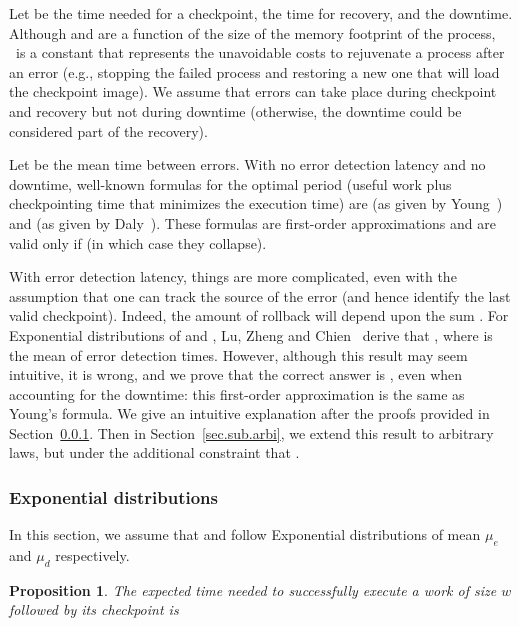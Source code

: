 \documentclass[10pt,table]{article}
\newtheorem{proposition}{Proposition}
\newcommand{\ema}[1]{\ensuremath{#1}\xspace}
\newcommand{\www}{\ema{w}}
\newcommand{\mue}{\ema{\mu_{e}}}
\newcommand{\mud}{\ema{\mu_{d}}}
\begin{document}
 Let  be the time needed for a checkpoint,   the time for
recovery, and  the downtime. Although  and  are
a function of the size of the memory footprint of the process, ~is a constant 
that represents the unavoidable costs to rejuvenate a
process after an error (e.g., stopping the failed process and restoring
a new one that will load the checkpoint image). We assume that errors
can take place during checkpoint and recovery but not during downtime (otherwise, the downtime
could be considered part of the recovery). 

Let  be the mean time between errors.
With  no error detection latency and no downtime, well-known formulas for the optimal period 
(useful work plus checkpointing time that minimizes the execution time)
are  (as given by Young~\cite{young74})
and  (as given by Daly~\cite{daly04}).
These formulas are first-order approximations and are valid only if  
(in which case they collapse). 

With error detection latency, things are more complicated, even with the assumption
 that one can track the source of the error (and hence identify the last valid checkpoint). 
 Indeed, the amount of rollback will depend upon the sum .
For Exponential distributions of   and , Lu, Zheng and Chien~\cite{LuZhengChien2013} derive that 
   , 
  where  is the mean of error detection times. 
However, although this result may seem intuitive, it is wrong, and we prove that the correct answer
is , even when accounting for the downtime: 
this first-order approximation is the same as Young's formula. We give an intuitive explanation after the proofs
provided in Section~\ref{sec.sub.exp}. Then in Section~\ref{sec.sub.arbi}, we extend this result to
arbitrary laws, but under the additional constraint that .

\subsubsection{Exponential distributions}
\label{sec.sub.exp}

In this section, we assume that  and  follow Exponential distributions of mean \mue and \mud respectively.

\begin{proposition}
\label{th.work}
The expected time needed to successfully execute a work of size \www followed by its checkpoint is

\end{proposition}
\end{document}
